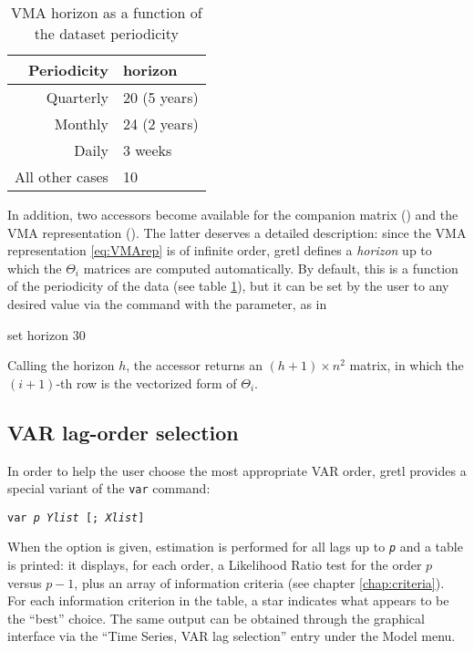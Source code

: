 \begin{table}[htbp]
  \centering
  \begin{tabular}{rl}
    \hline
    Periodicity & horizon \\
    \hline
    Quarterly & 20 (5 years) \\
    Monthly & 24 (2 years) \\
    Daily & 3 weeks \\
    All other cases & 10 \\
    \hline
  \end{tabular}
  \caption{VMA horizon as a function of the dataset periodicity}
  \label{tab:var-horizon}
\end{table}

In addition, two accessors become available for the companion matrix
() and the VMA representation (). The
latter deserves a detailed description: since the VMA representation
\eqref{eq:VMArep} is of infinite order, gretl defines a
\emph{horizon} up to which the $\Theta_i$ matrices are computed
automatically. By default, this is a function of the periodicity of
the data (see table \ref{tab:var-horizon}), but it can be set by the
user to any desired value via the  command with the
 parameter, as in
\begin{code}
set horizon 30
\end{code}
Calling the horizon $h$, the  accessor returns an $(h+1)
\times n^2$ matrix, in which the $(i+1)$-th row is the vectorized form
of $\Theta_i$.

\subsection{VAR lag-order selection}

In order to help the user choose the most appropriate VAR order,
gretl provides a special variant of the \texttt{var} command:
\begin{flushleft}
  \texttt{var \emph{p} \emph{Ylist} [; \emph{Xlist}]} 
\end{flushleft}
When the  option is given, estimation is performed
for all lags up to \texttt{\emph{p}} and a table is printed: it
displays, for each order, a Likelihood Ratio test for the order $p$
versus $p-1$, plus an array of information criteria (see chapter
\ref{chap:criteria}). For each information criterion in the table, a
star indicates what appears to be the ``best'' choice. The same output
can be obtained through the graphical interface via the ``Time Series,
VAR lag selection'' entry under the Model menu.

